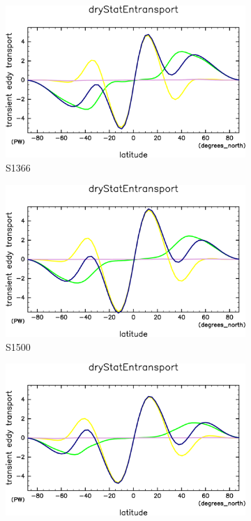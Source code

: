 \documentclass[body]{subfiles}
\begin{document}
\begin{figure}[t]
	\centering
	\begin{subfigure}{.4\textwidth}
		\centering
		\includegraphics[width=\columnwidth]{S1366/MeriHeatTrans@dryStatEn,time=14600:14965-crop-rotate.pdf}
		\caption{S1366}\label{乾燥静的エネルギーS1366}
	\end{subfigure}
	\begin{subfigure}{.4\textwidth}
		\centering
		\includegraphics[width=\columnwidth]{S1500/MeriHeatTrans@dryStatEn,time=3650:4015-crop-rotate.pdf}
		\caption{S1500}\label{乾燥静的エネルギーS1500}
	\end{subfigure}
	\begin{subfigure}{.4\textwidth}
		\centering
		\includegraphics[width=\columnwidth]{S1600/MeriHeatTrans@dryStatEn,time=3650:4015-crop-rotate.pdf}

\end{subfigure}
\end{figure}
\end{document}
